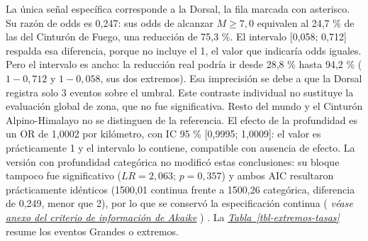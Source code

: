 \documentclass[
  spanish,
  letterpaper,
  DIV=11,
  numbers=noendperiod]{scrartcl}
\newcommand{\asesoriaStyledRef}[1]{%
  {\hypersetup{linkcolor=asesoriaLinkColor,urlcolor=asesoriaLinkColor,citecolor=asesoriaLinkColor}\textcolor{asesoriaLinkColor}{\emph{#1}}}%
}
\newcommand{\asesoriaParenRef}[1]{%
  \textnormal{\textcolor{asesoriaTextColor}{(}}%
  {\hypersetup{linkcolor=asesoriaLinkColor,urlcolor=asesoriaLinkColor,citecolor=asesoriaLinkColor}\textcolor{asesoriaTextColor}{\emph{#1}}}%
  \textnormal{\textcolor{asesoriaTextColor}{)}}%
}
\newcommand{\asesoriaTableLink}[1]{\hyperref[#1]{Tabla~\ref*{#1}}}
\newcommand{\asesoriaTableRef}[1]{\asesoriaStyledRef{\asesoriaTableLink{#1}}}
\begin{document}
La única señal específica corresponde a la Dorsal, la fila marcada con
asterisco. Su razón de odds es 0,247: sus odds de alcanzar
\(M \geq 7{,}0\) equivalen al 24,7 \% de las del Cinturón de Fuego, una
reducción de 75,3 \%. El intervalo {[}0,058; 0,712{]} respalda esa
diferencia, porque no incluye el 1, el valor que indicaría odds iguales.
Pero el intervalo es ancho: la reducción real podría ir desde 28,8 \%
hasta 94,2 \% (\(1-0{,}712\) y \(1-0{,}058\), sus dos extremos). Esa
imprecisión se debe a que la Dorsal registra solo 3 eventos sobre el
umbral. Este contraste individual no sustituye la evaluación global de
zona, que no fue significativa. Resto del mundo y el Cinturón
Alpino-Himalayo no se distinguen de la referencia. El efecto de la
profundidad es un OR de 1,0002 por kilómetro, con IC 95 \% {[}0,9995;
1,0009{]}: el valor es prácticamente 1 y el intervalo lo contiene,
compatible con ausencia de efecto. La versión con profundidad categórica
no modificó estas conclusiones: su bloque tampoco fue significativo
(\(LR = 2{,}063\); \(p = 0{,}357\)) y ambos AIC resultaron prácticamente
idénticos (1500,01 continua frente a 1500,26 categórica, diferencia de
0,249, menor que 2), por lo que se conservó la especificación continua
\asesoriaParenRef{véase \hyperref[sec-anexo-aic]{anexo del criterio de información de Akaike}}.
La \asesoriaTableRef{tbl-extremos-tasas} resume los eventos Grandes o
extremos.
\end{document}
